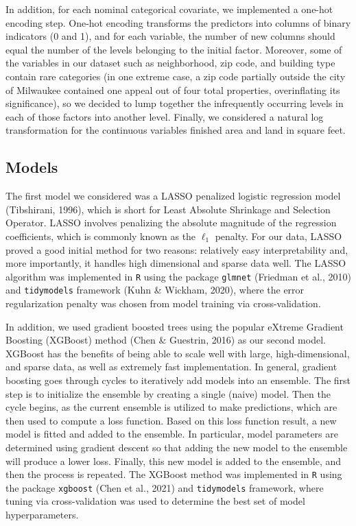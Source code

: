 \documentclass[
  12pt,
]{article}
\begin{document}
In addition, for each nominal categorical covariate, we implemented a
one-hot encoding step. One-hot encoding transforms the predictors into
columns of binary indicators (0 and 1), and for each variable, the
number of new columns should equal the number of the levels belonging to
the initial factor. Moreover, some of the variables in our dataset such
as neighborhood, zip code, and building type contain rare categories (in
one extreme case, a zip code partially outside the city of Milwaukee
contained one appeal out of four total properties, overinflating its
significance), so we decided to lump together the infrequently occurring
levels in each of those factors into another level. Finally, we
considered a natural log transformation for the continuous variables
finished area and land in square feet.

\hypertarget{models}{%
\subsection{Models}\label{models}}

The first model we considered was a LASSO penalized logistic regression
model (Tibshirani, 1996), which is short for Least Absolute Shrinkage
and Selection Operator. LASSO involves penalizing the absolute magnitude
of the regression coefficients, which is commonly known as the
\(\ell_1\) penalty. For our data, LASSO proved a good initial method for
two reasons: relatively easy interpretability and, more importantly, it
handles high dimensional and sparse data well. The LASSO algorithm was
implemented in \texttt{R} using the package \texttt{glmnet} (Friedman et
al., 2010) and \texttt{tidymodels} framework (Kuhn \& Wickham, 2020),
where the error regularization penalty was chosen from model training
via cross-validation.

In addition, we used gradient boosted trees using the popular eXtreme
Gradient Boosting (XGBoost) method (Chen \& Guestrin, 2016) as our
second model. XGBoost has the benefits of being able to scale well with
large, high-dimensional, and sparse data, as well as extremely fast
implementation. In general, gradient boosting goes through cycles to
iteratively add models into an ensemble. The first step is to initialize
the ensemble by creating a single (naive) model. Then the cycle begins,
as the current ensemble is utilized to make predictions, which are then
used to compute a loss function. Based on this loss function result, a
new model is fitted and added to the ensemble. In particular, model
parameters are determined using gradient descent so that adding the new
model to the ensemble will produce a lower loss. Finally, this new model
is added to the ensemble, and then the process is repeated. The XGBoost
method was implemented in \texttt{R} using the package \texttt{xgboost}
(Chen et al., 2021) and \texttt{tidymodels} framework, where tuning via
cross-validation was used to determine the best set of model
hyperparameters.
\end{document}
